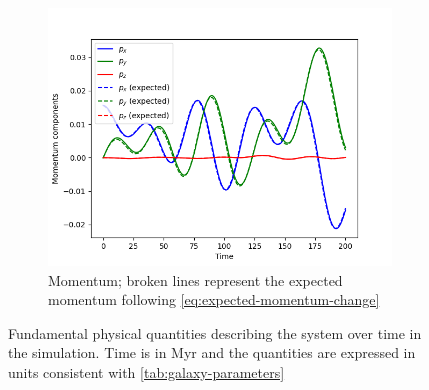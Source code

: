 \begin{figure}[htp]
    \vspace{0.5cm}

    \begin{subfigure}[b]{0.45\textwidth}
        \centering
        \includegraphics[width=\textwidth]{img/p3m/momentum.png}
        \caption{Momentum; broken lines represent the expected momentum following \autoref{eq:expected-momentum-change}}
        \label{fig:physical-quantities-p3m-sub3}
    \end{subfigure}

    \caption{Fundamental physical quantities describing the system over time in the \PThreeM{} simulation.
        Time is in Myr and the quantities are expressed in units consistent with \autoref{tab:galaxy-parameters}}
    \label{fig:physical-quantities-p3m}
\end{figure}

